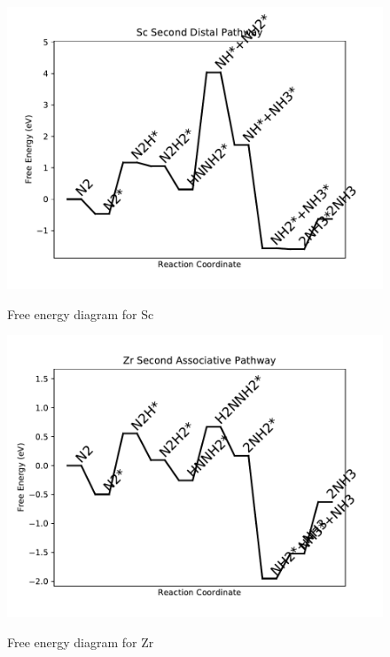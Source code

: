 \documentclass[journal=jacsat,manuscript=article]{achemso}
\begin{document}
\begin{figure}
\includegraphics[width=1\linewidth]{data/plots/Sc_distal_2.pdf}
\label{fig:Sc_distal_2}
\caption{Free energy diagram for Sc}
\end{figure}

\newpage
\begin{figure}
\includegraphics[width=1\linewidth]{data/plots/Zr_associative_2.pdf}
\label{fig:Zr_associative_2}
\caption{Free energy diagram for Zr}
\end{figure}
\end{document}
